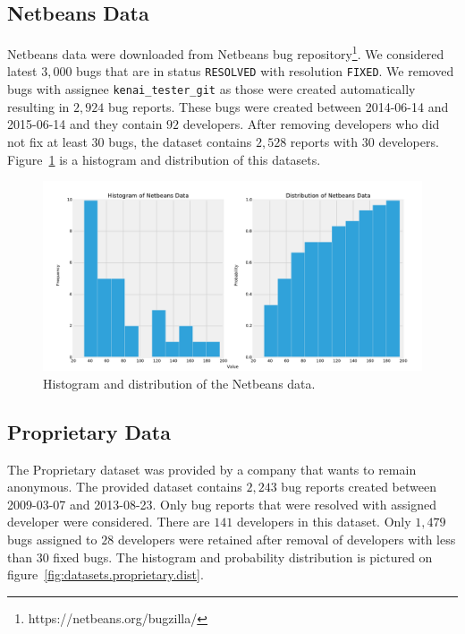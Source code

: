 \subsection{Netbeans Data}

Netbeans data were downloaded from Netbeans bug repository\footnote{https://netbeans.org/bugzilla/}. We considered latest $3,000$ bugs that are in status \texttt{RESOLVED} with resolution \texttt{FIXED}. We removed bugs with assignee \texttt{kenai\_tester\_git} as those were created automatically resulting in $2,924$ bug reports. These bugs were created between 2014-06-14 and 2015-06-14 and they contain $92$ developers. After removing developers who did not fix at least 30 bugs, the dataset contains $2,528$ reports with $30$ developers. Figure~\ref{fig:datasets.netbeans.dist} is a histogram and distribution of this datasets.

\begin{figure}[htbp]
    \centering
        \includegraphics[width=\textwidth]{./images/distribution/netbeans.pdf}
    \caption{Histogram and distribution of the Netbeans data.}
    \label{fig:datasets.netbeans.dist}
\end{figure}

\subsection{Proprietary Data}

The Proprietary dataset was provided by a company that wants to remain anonymous. The provided dataset contains $2,243$ bug reports created between 2009-03-07 and 2013-08-23. Only bug reports that were resolved with assigned developer were considered. There are $141$ developers in this dataset. Only $1,479$ bugs assigned to $28$ developers were retained after removal of developers with less than $30$ fixed bugs. The histogram and probability distribution is pictured on figure~\ref{fig:datasets.proprietary.dist}.

